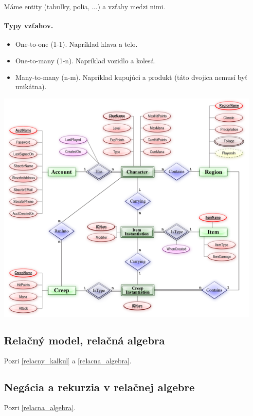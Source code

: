\documentclass[10pt,a4paper]{article}
\begin{document}
Máme entity (tabuľky, polia, ...) a vzťahy medzi nimi.
\paragraph{Typy vzťahov.}
\begin{itemize}
\item One-to-one (1-1). Napríklad hlava a telo.
\item One-to-many (1-n). Napríklad vozidlo a kolesá.
\item Many-to-many (n-m). Napríklad kupujúci a produkt (táto dvojica nemusí byť unikátna).
\end{itemize}

\begin{center}
\includegraphics[scale=0.5]{db_entity_relationship.png}
\end{center}

\subsection{Relačný model, relačná algebra}
Pozri \ref{relacny_kalkul} a \ref{relacna_algebra}.

\subsection{Negácia a rekurzia v relačnej algebre}
Pozri \ref{relacna_algebra}.
\end{document}

